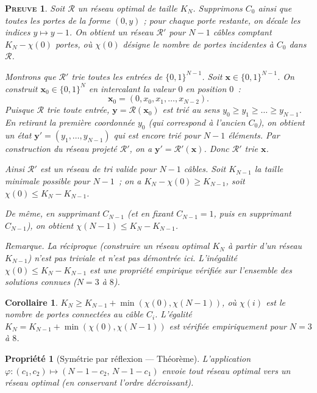 \documentclass[11pt,a4paper]{article}
\theoremstyle{propretheoreme}
\newtheorem{propriete}{Propriété}
\theoremstyle{proprepreuve}
\newtheorem*{preuve}{\small\textsc{Preuve}}
\theoremstyle{proprecorollaire}
\newtheorem*{corollaire}{Corollaire}
\begin{document}
\begin{preuve}
Soit $\mathcal{R}$ un réseau optimal de taille $K_N$. Supprimons $C_0$ ainsi que toutes les portes de la forme $(0,y)$ ; pour chaque porte restante, on décale les indices $y \mapsto y-1$. On obtient un réseau $\mathcal{R}'$ pour $N-1$ câbles comptant $K_N - \chi(0)$ portes, où $\chi(0)$ désigne le nombre de portes incidentes à $C_0$ dans $\mathcal{R}$.

Montrons que $\mathcal{R}'$ trie toutes les entrées de $\{0,1\}^{N-1}$. Soit $\mathbf{x} \in \{0,1\}^{N-1}$. On construit $\mathbf{x}_0 \in \{0,1\}^N$ en intercalant la valeur $0$ en position $0$~:
\[
\mathbf{x}_0 = (0, x_0, x_1, \dots, x_{N-2}).
\]
Puisque $\mathcal{R}$ trie toute entrée, $\mathbf{y} = \mathcal{R}(\mathbf{x}_0)$ est trié au sens $y_0 \ge y_1 \ge \dots \ge y_{N-1}$. En retirant la première coordonnée $y_0$ (qui correspond à l'ancien $C_0$), on obtient un état $\mathbf{y}' = (y_1,\dots,y_{N-1})$ qui est encore trié pour $N-1$ éléments. Par construction du réseau projeté $\mathcal{R}'$, on a $\mathbf{y}' = \mathcal{R}'(\mathbf{x})$. Donc $\mathcal{R}'$ trie $\mathbf{x}$.

Ainsi $\mathcal{R}'$ est un réseau de tri valide pour $N-1$ câbles. Soit $K_{N-1}$ la taille minimale possible pour $N-1$~; on a $K_N - \chi(0) \ge K_{N-1}$, soit $\chi(0) \le K_N - K_{N-1}$.

De même, en supprimant $C_{N-1}$ (et en fixant $C_{N-1}=1$, puis en supprimant $C_{N-1}$), on obtient $\chi(N-1) \le K_N - K_{N-1}$.

\textit{Remarque.} La réciproque (construire un réseau optimal $K_N$ à partir d'un réseau $K_{N-1}$) n'est pas triviale et n'est pas démontrée ici. L'inégalité $\chi(0) \le K_N - K_{N-1}$ est une propriété \textit{empirique} vérifiée sur l'ensemble des solutions connues ($N=3$ à $8$).
\end{preuve}

\begin{corollaire}
$K_N \ge K_{N-1} + \min(\chi(0),\chi(N-1))$, où $\chi(i)$ est le nombre de portes connectées au câble $C_i$. L'égalité $K_N = K_{N-1} + \min(\chi(0),\chi(N-1))$ est vérifiée empiriquement pour $N=3$ à $8$.
\end{corollaire}

\begin{propriete}[Symétrie par réflexion --- Théorème]\label{p3}
L'application $\varphi : (c_1,c_2) \mapsto (N-1-c_2,\,N-1-c_1)$ envoie tout réseau optimal vers un réseau optimal (en conservant l'ordre décroissant).
\end{propriete}
\end{document}
